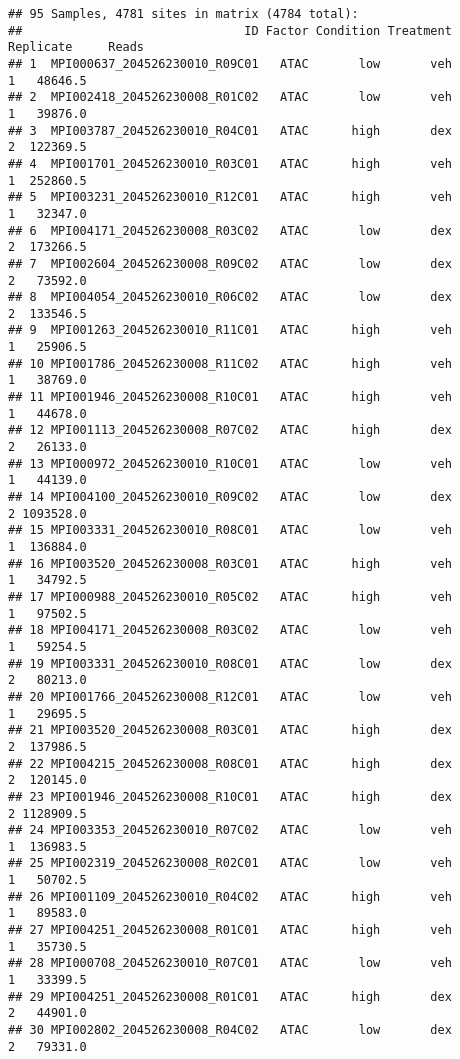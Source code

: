 \documentclass[
]{article}
\begin{document}
\begin{verbatim}
## 95 Samples, 4781 sites in matrix (4784 total):
##                               ID Factor Condition Treatment Replicate     Reads
## 1  MPI000637_204526230010_R09C01   ATAC       low       veh         1   48646.5
## 2  MPI002418_204526230008_R01C02   ATAC       low       veh         1   39876.0
## 3  MPI003787_204526230010_R04C01   ATAC      high       dex         2  122369.5
## 4  MPI001701_204526230010_R03C01   ATAC      high       veh         1  252860.5
## 5  MPI003231_204526230010_R12C01   ATAC      high       veh         1   32347.0
## 6  MPI004171_204526230008_R03C02   ATAC       low       dex         2  173266.5
## 7  MPI002604_204526230008_R09C02   ATAC       low       dex         2   73592.0
## 8  MPI004054_204526230010_R06C02   ATAC       low       dex         2  133546.5
## 9  MPI001263_204526230010_R11C01   ATAC      high       veh         1   25906.5
## 10 MPI001786_204526230008_R11C02   ATAC      high       veh         1   38769.0
## 11 MPI001946_204526230008_R10C01   ATAC      high       veh         1   44678.0
## 12 MPI001113_204526230008_R07C02   ATAC      high       dex         2   26133.0
## 13 MPI000972_204526230010_R10C01   ATAC       low       veh         1   44139.0
## 14 MPI004100_204526230010_R09C02   ATAC       low       dex         2 1093528.0
## 15 MPI003331_204526230010_R08C01   ATAC       low       veh         1  136884.0
## 16 MPI003520_204526230008_R03C01   ATAC      high       veh         1   34792.5
## 17 MPI000988_204526230010_R05C02   ATAC      high       veh         1   97502.5
## 18 MPI004171_204526230008_R03C02   ATAC       low       veh         1   59254.5
## 19 MPI003331_204526230010_R08C01   ATAC       low       dex         2   80213.0
## 20 MPI001766_204526230008_R12C01   ATAC       low       veh         1   29695.5
## 21 MPI003520_204526230008_R03C01   ATAC      high       dex         2  137986.5
## 22 MPI004215_204526230008_R08C01   ATAC      high       dex         2  120145.0
## 23 MPI001946_204526230008_R10C01   ATAC      high       dex         2 1128909.5
## 24 MPI003353_204526230010_R07C02   ATAC       low       veh         1  136983.5
## 25 MPI002319_204526230008_R02C01   ATAC       low       veh         1   50702.5
## 26 MPI001109_204526230010_R04C02   ATAC      high       veh         1   89583.0
## 27 MPI004251_204526230008_R01C01   ATAC      high       veh         1   35730.5
## 28 MPI000708_204526230010_R07C01   ATAC       low       veh         1   33399.5
## 29 MPI004251_204526230008_R01C01   ATAC      high       dex         2   44901.0
## 30 MPI002802_204526230008_R04C02   ATAC       low       dex         2   79331.0

\end{verbatim}
\end{document}
